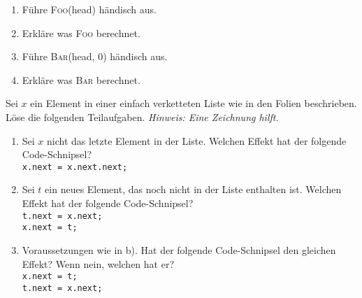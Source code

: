 \documentclass{uebung_cs}
\begin{document}
\begin{aufgabe}
	\begin{enumerate}
		\item %
    Führe \textsc{Foo}(head) händisch aus.
		\item %
    Erkläre was \textsc{Foo} berechnet.
		\item Führe \textsc{Bar}(head, 0) händisch aus.
		\item Erkläre was \textsc{Bar} berechnet.
	\end{enumerate}
\end{aufgabe}

\begin{aufgabe}%
	Sei $x$ ein Element in einer einfach verketteten Liste wie in den Folien beschrieben.
	Löse die folgenden Teilaufgaben. \emph{Hinweis: Eine Zeichnung hilft.}
	\begin{enumerate}
		\item Sei $x$ nicht das letzte Element in der Liste.
		Welchen Effekt hat der folgende Code-Schnipsel?\\
		\hspace*{20pt}\texttt{x.next = x.next.next;}

		\item Sei $t$ ein neues Element, das noch nicht in der Liste enthalten ist.
		Welchen Effekt hat der folgende Code-Schnipsel?\\
		\hspace*{20pt}\texttt{t.next = x.next;}\\
		\hspace*{20pt}\texttt{x.next = t;}

		\item Voraussetzungen wie in b).
		Hat der folgende Code-Schnipsel den gleichen Effekt?
		Wenn nein, welchen hat er?\\
		\hspace*{20pt}\texttt{x.next = t;}\\
		\hspace*{20pt}\texttt{t.next = x.next;}
	\end{enumerate}
\end{aufgabe}

\end{document}
